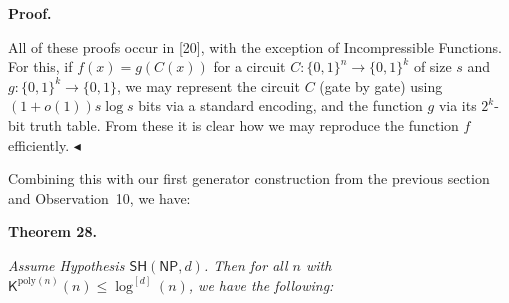 \documentclass[10pt,a4paper]{article}
\begin{document}



\par\medskip\noindent\textbf{Proof.}\par




All of these proofs occur in [20], with the exception of Incompressible Functions. For this, if $f(x)=g(C(x))$ for a circuit $C:\{0,1\}^{n}\to\{0,1\}^{k}$ of size $s$ and $g:\{0,1\}^{k}\to\{0,1\}$, we may represent the circuit $C$ (gate by gate) using $(1+o(1))s\log s$ bits via a standard encoding, and the function $g$ via its $2^{k}$-bit truth table. From these it is clear how we may reproduce the function $f$ efficiently.
$\blacktriangleleft$\par




Combining this with our first generator construction from the previous section and Observation 10, we have:\par





\par\medskip\noindent\textbf{
\textbf{Theorem 28}\textbf{.}
}\par



\emph{Assume Hypothesis $\mathsf{SH}({\mathsf{NP}},d)$. Then for all $n$ with ${\mathsf{K}}^{\mathrm{poly}(n)}(n)\leq\log^{[d]}(n)$, we have the following:}\par
\end{document}
